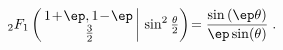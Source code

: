 \begin{equation}
{}_{2}F_1 \left(\begin{array}{c|} \!\! 1\!+\!\ep, 1 \!-\! \ep\! \\
\frac{3}{2} \end{array} ~\sin^2 \tfrac{\theta}{2} \right)\! =
\frac{\sin \left( \ep \theta \right)}{\ep \sin(\theta)} \; .
\label{basis_I}
\end{equation}

